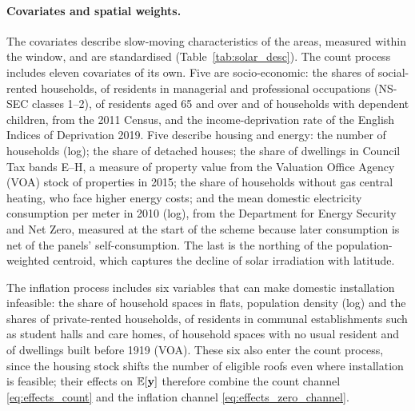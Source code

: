 \paragraph{Covariates and spatial weights.}
The covariates describe slow-moving characteristics of the areas, measured within the window, and are standardised (Table~\ref{tab:solar_desc}).
The count process includes eleven covariates of its own.
Five are socio-economic: the shares of social-rented households, of residents in managerial and professional occupations (NS-SEC classes 1--2), of residents aged 65 and over and of households with dependent children, from the 2011 Census, and the income-deprivation rate of the English Indices of Deprivation 2019.
Five describe housing and energy: the number of households (log); the share of detached houses; the share of dwellings in Council Tax bands E--H, a measure of property value from the Valuation Office Agency (VOA) stock of properties in 2015; the share of households without gas central heating, who face higher energy costs; and the mean domestic electricity consumption per meter in 2010 (log), from the Department for Energy Security and Net Zero, measured at the start of the scheme because later consumption is net of the panels' self-consumption.
The last is the northing of the population-weighted centroid, which captures the decline of solar irradiation with latitude.

The inflation process includes six variables that can make domestic installation infeasible: the share of household spaces in flats, population density (log) and the shares of private-rented households, of residents in communal establishments such as student halls and care homes, of household spaces with no usual resident and of dwellings built before 1919 (VOA).
These six also enter the count process, since the housing stock shifts the number of eligible roofs even where installation is feasible; their effects on $\mathbb{E}[\mathbf{y}]$ therefore combine the count channel \eqref{eq:effects_count} and the inflation channel \eqref{eq:effects_zero_channel}.

